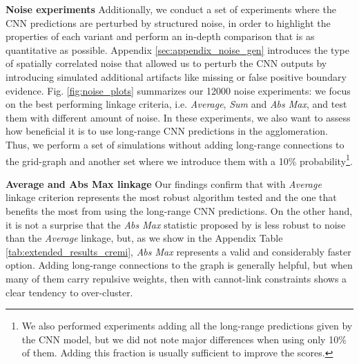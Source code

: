\textbf{Noise experiments }  Additionally, we conduct a set of experiments where the CNN predictions are perturbed by structured noise, in order to highlight the properties of each \algname{} variant and perform an in-depth comparison that is as quantitative as possible. Appendix \ref{sec:appendix_noise_gen} introduces the type of spatially correlated noise that allowed us to perturb the CNN outputs by introducing simulated additional artifacts like missing or false positive boundary evidence. 
Fig. \ref{fig:noise_plots} summarizes our 12000 noise experiments: we focus on the best performing linkage criteria, i.e. \emph{Average}, \emph{Sum} and \emph{Abs Max}, and test them with different amount of noise. 
In these experiments, we also want to assess how beneficial it is to use long-range CNN predictions in the agglomeration. Thus, we perform a set of simulations without adding long-range connections to the grid-graph and another set where we introduce them with a 10\% probability\footnote{We also performed experiments adding all the long-range predictions given by the CNN model, but we did not note major differences when using only 10\% of them. Adding this fraction is usually sufficient to improve the scores.}.

\textbf{Average and Abs Max linkage } Our findings confirm that \algname{} with \emph{Average} linkage criterion represents the most robust algorithm tested and the one that benefits the most from using the long-range CNN predictions. On the other hand, it is not a surprise that the \emph{Abs Max} statistic proposed by \cite{wolf2018mutex} is less robust to noise than the \emph{Average} linkage, but, as we show in the Appendix Table \ref{tab:extended_results_cremi}, \emph{Abs Max} represents a valid and considerably faster option. 
Adding long-range connections to the graph is generally helpful, but when many of them carry repulsive weights, then \algname{} with cannot-link constraints shows a clear tendency to over-cluster.    

